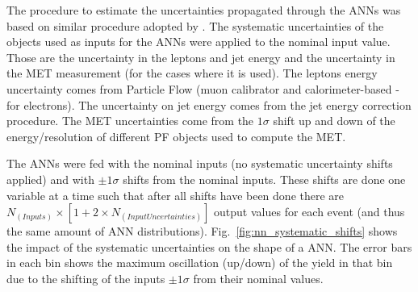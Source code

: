 The procedure to estimate the uncertainties propagated through the ANNs was based on similar procedure adopted by \cite{bib:CMS-AN-12-141, bib:CMS-PAS-HIG-16-022, bib:ATLAS-CONF-2017-041}. The systematic uncertainties of the objects used as inputs for the ANNs were applied to the nominal input value. Those are the uncertainty in the leptons and jet energy and the uncertainty in the MET measurement (for the cases where it is used). The leptons energy uncertainty comes from Particle Flow (muon calibrator and calorimeter-based - for electrons). The uncertainty on jet energy comes from the jet energy correction procedure. The MET uncertainties come from the $1\sigma$ shift up and down of the energy/resolution of different PF objects used to compute the MET.

The ANNs were fed with the nominal inputs (no systematic uncertainty shifts applied) and with $\pm 1 \sigma$ shifts from the nominal inputs. These shifts are done one variable at a time such that after all shifts have been done there are $N_{(Inputs)} \times [1+2 \times N_{(InputUncertainties)}]$ output values for each event (and thus the same amount of ANN distributions). Fig.~\ref{fig:nn_systematic_shifts} shows the impact of the systematic uncertainties on the shape of a ANN. The error bars in each bin shows the maximum oscillation (up/down) of the yield in that bin due to the shifting of the inputs $\pm 1 \sigma$ from their nominal values. %

